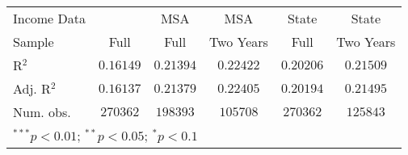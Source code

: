 \begin{tabular}{l c c c c c}
Income Data          &                  & MSA              & MSA              & State            & State            \\
Sample               & Full             & Full             & Two Years        & Full             & Two Years        \\
R$^2$                & $0.16149$        & $0.21394$        & $0.22422$        & $0.20206$        & $0.21509$        \\
Adj. R$^2$           & $0.16137$        & $0.21379$        & $0.22405$        & $0.20194$        & $0.21495$        \\
Num. obs.            & $270362$         & $198393$         & $105708$         & $270362$         & $125843$         \\
\hline
\multicolumn{6}{l}{\scriptsize{$^{***}p<0.01$; $^{**}p<0.05$; $^{*}p<0.1$}}
\end{tabular}
